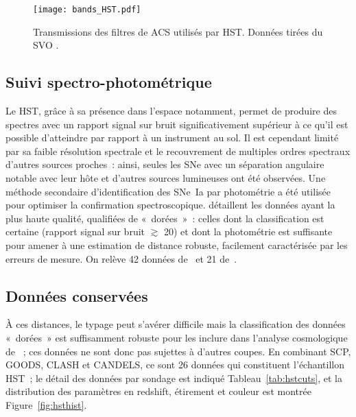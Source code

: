 \documentclass[../main/main.tex]{subfiles}
\begin{document}
\begin{figure}[!ht]
    \centering
    \texttt{[image: bands\_HST.pdf]}
    \caption[Transmissions des filtres de la caméra du sondage HST]
    {Transmissions des filtres de ACS utilisés par HST. Données tirées du SVO
    \citep{rodrigo2020}.}
    \label{fig:hstbands}
\end{figure}

\subsection{Suivi spectro-photométrique}\label{ssec:hstspectro}

Le HST, grâce à sa présence dans l'espace notamment, permet de produire des
spectres avec un rapport signal sur bruit significativement supérieur à ce qu'il
est possible d'atteindre par rapport à un instrument au sol. Il est cependant
limité par sa faible résolution spectrale et le recouvrement de multiples ordres
spectraux d'autres sources proches~: ainsi, seules les SNe avec un séparation
angulaire notable avec leur hôte et d'autres sources lumineuses ont été
observées. Une méthode secondaire d'identification des SNe~Ia par photométrie a
été utilisée pour optimiser la confirmation spectroscopique. \cite{riess2007}
détaillent les données ayant la plus haute qualité, qualifiées de «~dorées~»~:
celles dont la classification est certaine (rapport signal sur bruit $\gtrsim$
20) et dont la photométrie est suffisante pour amener à une estimation de
distance robuste, facilement caractérisée par les erreurs de mesure. On relève
42 données de~\cite{strolger2004} et 21 de~\cite{riess2007}.

\subsection{Données conservées}\label{ssec:hstdata}

À ces distances, le typage peut s'avérer difficile mais la classification des
données «~dorées~» est suffisamment robuste pour les inclure dans l'analyse
cosmologique de \citep{scolnic2018}~; ces données ne sont donc pas sujettes à
d'autres coupes. En combinant SCP, GOODS, CLASH et CANDELS, ce sont 26 données
qui constituent l'échantillon HST~; le détail des données par sondage est
indiqué Tableau~\ref{tab:hstcuts}, et la distribution des paramètres en redshift,
étirement et couleur est montrée Figure~\ref{fig:hsthist}.
\end{document}
